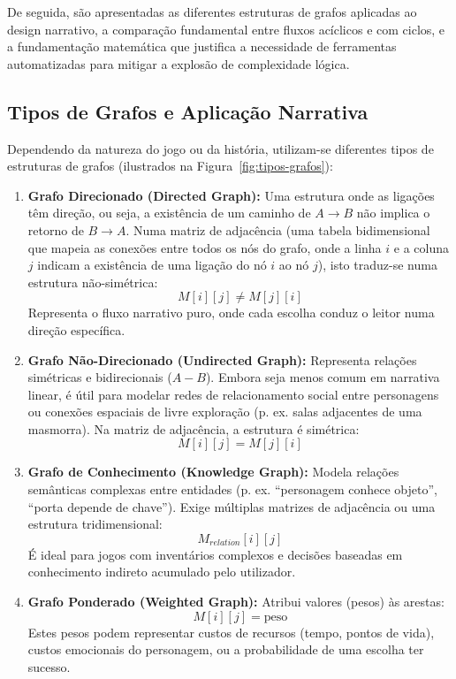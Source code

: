 De seguida, são apresentadas as diferentes estruturas de grafos aplicadas ao design narrativo, a comparação fundamental entre fluxos acíclicos e com ciclos, e a fundamentação matemática que justifica a necessidade de ferramentas automatizadas para mitigar a explosão de complexidade lógica.

\subsection{Tipos de Grafos e Aplicação Narrativa}
Dependendo da natureza do jogo ou da história, utilizam-se diferentes tipos de estruturas de grafos (ilustrados na Figura~\ref{fig:tipos-grafos}):
\begin{enumerate}
    \item \textbf{Grafo Direcionado (Directed Graph):} Uma estrutura onde as ligações têm direção, ou seja, a existência de um caminho de $A \to B$ não implica o retorno de $B \to A$. Numa matriz de adjacência (uma tabela bidimensional que mapeia as conexões entre todos os nós do grafo, onde a linha $i$ e a coluna $j$ indicam a existência de uma ligação do nó $i$ ao nó $j$), isto traduz-se numa estrutura não-simétrica:
    \[
    M[i][j] \neq M[j][i]
    \]
    Representa o fluxo narrativo puro, onde cada escolha conduz o leitor numa direção específica.
    
    \item \textbf{Grafo Não-Direcionado (Undirected Graph):} Representa relações simétricas e bidirecionais ($A - B$). Embora seja menos comum em narrativa linear, é útil para modelar redes de relacionamento social entre personagens ou conexões espaciais de livre exploração (p. ex. salas adjacentes de uma masmorra). Na matriz de adjacência, a estrutura é simétrica:
    \[
    M[i][j] = M[j][i]
    \]

    \item \textbf{Grafo de Conhecimento (Knowledge Graph):} Modela relações semânticas complexas entre entidades (p. ex. ``personagem conhece objeto'', ``porta depende de chave''). Exige múltiplas matrizes de adjacência ou uma estrutura tridimensional:
    \[
    M_{relation}[i][j]
    \]
    É ideal para jogos com inventários complexos e decisões baseadas em conhecimento indireto acumulado pelo utilizador.

    \item \textbf{Grafo Ponderado (Weighted Graph):} Atribui valores (pesos) às arestas:
    \[
    M[i][j] = \text{peso}
    \]
    Estes pesos podem representar custos de recursos (tempo, pontos de vida), custos emocionais do personagem, ou a probabilidade de uma escolha ter sucesso.
\end{enumerate}

